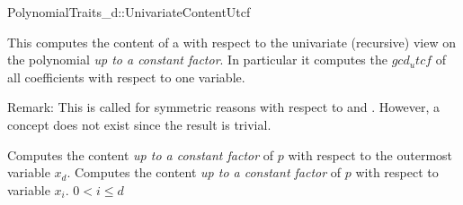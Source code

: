 \begin{ccRefConcept}{PolynomialTraits_d::UnivariateContentUtcf}

\ccDefinition

This  computes the content of a 
with respect to the univariate (recursive) view on the 
polynomial {\em up to  a constant factor}. 
In particular it computes the $gcd_utcf$ of all 
coefficients  with respect to one variable. 

Remark: This is called  for 
symmetric reasons with respect to  
and . 
However, a concept  does not exist
since the result is trivial. 
 
\ccRefines 
{}

\ccTypes

\ccGlue
{}\ccGlue
{}

\ccOperations
{}
         {Computes the content {\em up to  a constant factor} of $p$ with 
          respect to the outermost variable $x_d$. }
         {Computes the content {\em up to  a constant factor} of $p$ with 
          respect to variable $x_i$. 
          \ccPrecond $0<i \leq d$
         }


\ccSeeAlso

\\
\\

\end{ccRefConcept}
